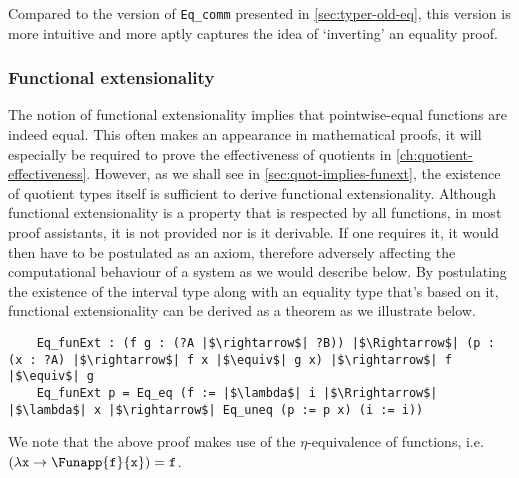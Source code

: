 \documentclass[12pt,twoside,maitrise]{dms}
\theoremstyle{definition}
\numberwithin{equation}{section}
\numberwithin{table}{chapter}
\numberwithin{figure}{chapter}
\newcommand\id[1] {\texttt{#1}}
\begin{document}
Compared to the version of \id{Eq\_comm} presented in
\autoref{sec:typer-old-eq}, this version is more intuitive and more aptly
captures the idea of `inverting' an equality proof.

\subsubsection*{Functional extensionality}\label{subsec:funext}
The notion of functional extensionality implies that pointwise-equal functions
are indeed equal. This often makes an appearance in mathematical proofs, it will
especially be required to prove the effectiveness of quotients in
\autoref{ch:quotient-effectiveness}. However, as we shall see in
\autoref{sec:quot-implies-funext}, the existence of quotient types itself is
sufficient to derive functional extensionality. Although functional
extensionality is a property that is respected by all functions, in most proof
assistants, it is not provided nor is it derivable. If one requires it, it would
then have to be postulated as an axiom, therefore adversely affecting the
computational behaviour of a system as we would describe below. By postulating
the existence of the interval type along with an equality type that's
based on it, functional extensionality can be derived as a theorem as we
illustrate below.

\begin{verbatim}
    Eq_funExt : (f g : (?A |$\rightarrow$| ?B)) |$\Rightarrow$| (p : (x : ?A) |$\rightarrow$| f x |$\equiv$| g x) |$\rightarrow$| f |$\equiv$| g
    Eq_funExt p = Eq_eq (f := |$\lambda$| i |$\Rrightarrow$| |$\lambda$| x |$\rightarrow$| Eq_uneq (p := p x) (i := i))
\end{verbatim}

We note that the above proof makes use of the $\eta$-equivalence of functions,
i.e. $(\lambda \id{x} \rightarrow \Funapp{\id{f}}{\id{x}}) = \id{f}$.


\end{document}
